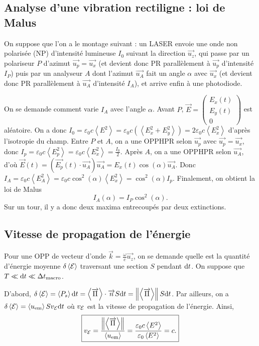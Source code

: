\subsection{Analyse d'une vibration rectiligne : loi de Malus}

On suppose que l'on a le montage suivant : un LASER envoie une onde non polarisée (NP) d'intensité lumineuse $I_0$ suivant la direction $\vec{u_z}$, qui passe par un polariseur $P$ d'azimut $\vec{u_p}=\vec{u_x}$ (et devient donc PR parallèlement à $\vec{u_p}$ d'intensité $I_P$) puis par un analyseur $A$ dont l'azimut $\vec{u_A}$ fait un angle $\alpha$ avec $\vec{u_x}$ (et devient donc PR parallèlement à $\vec{u_A}$ d'intensité $I_A$), et arrive enfin à une photodiode.

On se demande comment varie $I_A$ avec l'angle $\alpha$. Avant $P$, $\vec{E}=\begin{pmatrix}
    E_x(t)\\E_y(t)\\0
\end{pmatrix}$ est aléatoire. On a donc $I_0=\varepsilon_0c\left\langle E^{2}\right\rangle=\varepsilon_0c\left(\left\langle E_x^{2}+E_{y}^{2}\right\rangle\right)=2\varepsilon_0c\left\langle E_x^{2}\right\rangle$ d'après l'isotropie du champ. Entre $P$ et $A$, on a une OPPHPR selon $\vec{u_p}$ avec $\vec{u_p}=\vec{u_x}$, donc $I_p=\varepsilon_0c\left\langle E_p^{2}\right\rangle=\varepsilon_0c\left\langle E_x^{2}\right\rangle=\frac{I_0}{2}$. Après $A$, on a une OPPHPR selon $\vec{u_A}$, d'où $\vec{E}(t)=\left(\vec{E_p}(t)\cdot\vec{u_A}\right)\vec{u_A}=E_x(t)\cos(\alpha)\vec{u_A}$. Donc $I_A=\varepsilon_0c\left\langle E_A^2\right\rangle=\varepsilon_0c\cos^2(\alpha)\left\langle E_x^2\right\rangle=\cos^2(\alpha)I_p$. Finalement, on obtient la loi de Malus
\begin{equation*}
    I_A(\alpha)=I_P\cos^{2}(\alpha).
\end{equation*}
Sur un tour, il y a donc deux maxima entrecoupés par deux extinctions.

\subsection{Vitesse de propagation de l'énergie}

Pour une OPP de vecteur d'onde $\vec{k}=\frac{\omega}{c}\vec{u_z}$, on se demande quelle est la quantité d'énergie moyenne $\delta\left\langle \mathcal{E}\right\rangle$ traversant une section $S$ pendant $\mathrm{d} t$. On suppose que $T\ll\mathrm{d} t\ll\Delta t_{\mathrm{macro}}$.

D'abord, $\delta\left\langle\mathcal{E}\right\rangle=\left\langle P_s\right\rangle\mathrm{d} t=\left\langle\protect\overrightarrow{{\Pi}}\right\rangle\cdot\protect\overrightarrow{{n}}S\mathrm{d} t=\left\lVert\left\langle\protect\overrightarrow{{\Pi}}\right\rangle\right\rVert S\mathrm{d} t$. Par ailleurs, on a $\delta\left\langle\mathcal{E}\right\rangle=\left\langle u_{\mathrm{em}}\right\rangle Sv_{\mathcal{E}}\mathrm{d} t$ où $v_{\mathcal{E}}$ est la vitesse de propagation de l'énergie. Ainsi,
\begin{equation*}
    \boxed{
        v_{\mathcal{E}}=\frac{\left\lVert\left\langle\protect\overrightarrow{{\Pi}}\right\rangle\right\rVert}{\left\langle u_{\mathrm{em}}\right\rangle}=\frac{\varepsilon_0c\left\langle E^{2}\right\rangle}{\varepsilon_0\left\langle E^{2}\right\rangle}=c.
    }
\end{equation*}
